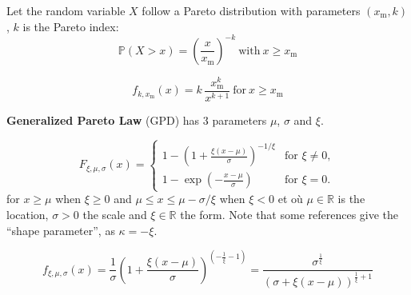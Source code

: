 


\begin{f}
Let the random variable \(X\) follow a Pareto distribution with parameters \((x_{\mathrm{m}},k)\), \(k\) is the Pareto index:
\[
\mathbb{P}(X>x)=\left(\frac{x}{x_{\mathrm{m}}}\right)^{-k}\ \mbox{with}\ x \geq x_{\mathrm{m}} 
\]


\[
f_{k,x_\mathrm{m}}(x) = k\,\frac{x_\mathrm{m}^k}{x^{k+1}}\ \mbox{for}\ x \ge x_\mathrm{m}
\]

\textbf{	Generalized Pareto Law} (GPD) has 3 parameters \(\mu\), \(\sigma\) and \(\xi\).


\[
F_{\xi,\mu,\sigma}(x) = \begin{cases} 1 - \left(1+ \frac{\xi(x-\mu)}{\sigma}\right)^{-1/\xi} & \text{for }\xi \neq 0, \\ 1 - \exp \left(-\frac{x-\mu}{\sigma}\right) & \text{for }\xi = 0. \end{cases} 
\]
for  \(x \geq \mu\)  when \(\xi \geq 0\)  and \( \mu \leq x \leq \mu - \sigma /\xi\)  when \( \xi < 0\) et où \(\mu\in\mathbb{R}\) is the location, \(\sigma>0\) the scale and  \(\xi\in\mathbb{R}\) the form. 
Note that some references give the \enquote{shape parameter}, as \(\kappa = - \xi\).

\[
f_{\xi,\mu,\sigma}(x) = \frac{1}{\sigma}\left(1 + \frac{\xi (x-\mu)}{\sigma}\right)^{\left(-\frac{1}{\xi} - 1\right)}
=
 \frac{\sigma^{\frac{1}{\xi}}}{\left(\sigma + \xi (x-\mu)\right)^{\frac{1}{\xi}+1}}
\]

\medskip

\begin{center}
		{\shorthandoff{!;}	
}
\end{center}



\end{f}
